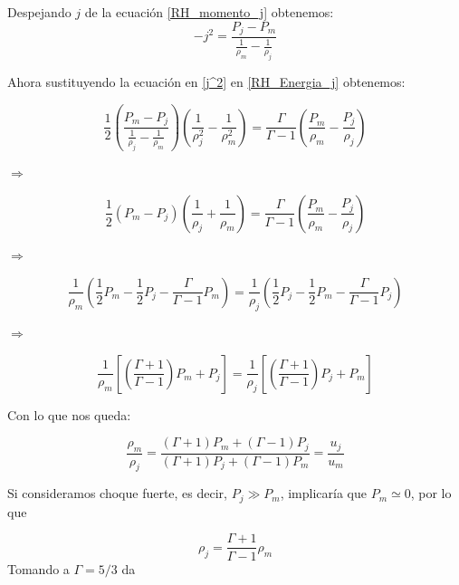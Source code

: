 \documentclass[12pt,a4paper]{book}
\begin{document}
Despejando $j$ de la ecuación \ref{RH_momento_j} obtenemos:
\begin{equation}\label{j^2}
-j^{2}=\frac{P_{j}-P_{m}}{\frac{1}{\rho_{m}}-\frac{1}{\rho_{j}}}
\end{equation}

Ahora sustituyendo la ecuación en \ref{j^2} en \ref{RH_Energia_j} obtenemos:

\begin{equation*}
\frac{1}{2} \left( \frac{P_{m}-P_{j}}{\frac{1}{\rho_{j}}-\frac{1}{\rho_{m}}} \right)
\left(\frac{1}{\rho_{j}^{2}}-\frac{1}{\rho_{m}^{2}} \right)
=
\frac{\Gamma}{\Gamma-1}
\left( \frac{P_{m}}{\rho_{m}}-\frac{P_{j}}{\rho_{j}} \right)
\end{equation*}

$\Rightarrow$

\begin{equation*}
\frac{1}{2}	\left( P_{m} - P_{j} \right)
\left( \frac{1}{\rho_{j}}+\frac{1}{\rho_{m}} \right)
=
\frac{\Gamma}{\Gamma-1}
\left( \frac{P_{m}}{\rho_{m}}-\frac{P_{j}}{\rho_{j}} \right)
\end{equation*}

$\Rightarrow$

\begin{equation*}
\frac{1}{\rho_{m}} \left( \frac{1}{2} P_{m}- \frac{1}{2} P_{j}-
\frac{\Gamma}{\Gamma-1} P_{m} \right)
=
\frac{1}{\rho_{j}} \left( \frac{1}{2} P_{j}- \frac{1}{2} P_{m}-
\frac{\Gamma}{\Gamma-1} P_{j} \right)
\end{equation*}

$\Rightarrow$

\begin{equation*}
\frac{1}{\rho_{m}} \left[  \left(\frac{\Gamma + 1}{\Gamma - 1} \right) P_{m} + P_{j} \right]
=
\frac{1}{\rho_{j}} \left[  \left(\frac{\Gamma + 1}{\Gamma - 1} \right) P_{j} + P_{m} \right]
\end{equation*}

Con lo que nos queda:

\begin{equation}\label{RH_no_rel_choque_no_fuerte}
\frac{\rho_{m}}{\rho_j} =
\frac{\left( \Gamma +1 \right) P_{m}+ \left( \Gamma -1 \right) P_{j
}}{\left(\Gamma +1 \right) P_{j}+ \left( \Gamma -1 \right) P_{m}}
= \frac{u_j}{u_m}
\end{equation}

Si consideramos choque fuerte, es decir, $P_j \gg P_m$, implicaría que $P_m \simeq 0$, por lo que

\begin{equation}
\rho_j = \frac{\Gamma +1}{\Gamma-1} \rho_m 
\end{equation}
Tomando a $\Gamma = 5/3$ da
\end{document}
